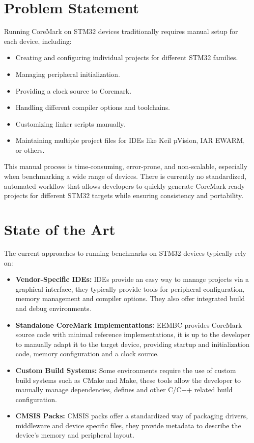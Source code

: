 \section{Problem Statement}
Running CoreMark on STM32 devices traditionally requires manual setup for each device, including:
\begin{itemize}
	\item Creating and configuring individual projects for different STM32 families.
	\item Managing peripheral initialization.
	\item Providing a clock source to Coremark.
	\item Handling different compiler options and toolchains.
	\item Customizing linker scripts manually.
	\item Maintaining multiple project files for IDEs like Keil µVision, IAR EWARM, or others.
\end{itemize}
This manual process is time-consuming, error-prone, and non-scalable, especially when benchmarking a wide range of devices.
There is currently no standardized, automated workflow that allows developers to quickly generate CoreMark-ready projects for different STM32 targets while ensuring consistency and portability.

\section{State of the Art}
The current approaches to running benchmarks on STM32 devices typically rely on:
\begin{itemize}
	\item \textbf{Vendor-Specific IDEs:}
		IDEs provide an easy way to manage projects via a graphical interface, they typically provide tools for peripheral configuration, memory management and compiler options.
		They also offer integrated build and debug environments.
	\item \textbf{Standalone CoreMark Implementations:}
		EEMBC provides CoreMark source code with minimal reference implementations, it is up to the developer to manually adapt it to the target device, providing startup and initialization code, memory configuration and a clock source.
	\item \textbf{Custom Build Systems:}
		Some environments require the use of custom build systems such as CMake and Make, these tools allow the developer to manually manage dependencies, defines and other C/C++ related build configuration.
	\item \textbf{CMSIS Packs:}
		CMSIS packs offer a standardized way of packaging drivers, middleware and device specific files, they provide metadata to describe the device's memory and peripheral layout.
\end{itemize}
